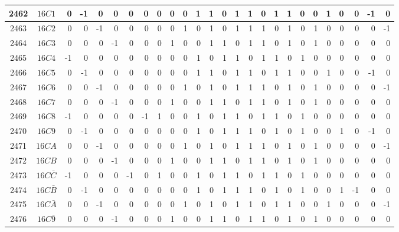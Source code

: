 \documentclass[12 pt]{article}%
\begin{document}
\begin{tiny}
\begin{centering}
\begin{longtable}{|c|c||rrrrrrrrrrrrrrrrrrrrrrrr|}
      \hline
      2462 & $16C1$ & 0 & -1 & 0 & 0 & 0 & 0 & 0 & 0 & 0 & 1 & 1 & 0 & 1 & 1 & 0 & 1 & 1 & 0 & 0 & 1 & 0 & 0 & -1 & 0 \\
      \hline
      2463 & $16C2$ & 0 & 0 & -1 & 0 & 0 & 0 & 0 & 0 & 1 & 0 & 1 & 0 & 1 & 1 & 1 & 0 & 1 & 0 & 1 & 0 & 0 & 0 & 0 & -1 \\
      \hline
      2464 & $16C3$ & 0 & 0 & 0 & -1 & 0 & 0 & 0 & 1 & 0 & 0 & 1 & 1 & 0 & 1 & 1 & 0 & 1 & 0 & 1 & 0 & 0 & 0 & 0 & 0 \\
      \hline
      2465 & $16C4$ & -1 & 0 & 0 & 0 & 0 & 0 & 0 & 0 & 0 & 1 & 0 & 1 & 1 & 0 & 1 & 1 & 0 & 1 & 0 & 0 & 0 & 0 & 0 & 0 \\
      \hline
      2466 & $16C5$ & 0 & -1 & 0 & 0 & 0 & 0 & 0 & 0 & 0 & 1 & 1 & 0 & 1 & 1 & 0 & 1 & 1 & 0 & 0 & 1 & 0 & 0 & -1 & 0 \\
      \hline
      2467 & $16C6$ & 0 & 0 & -1 & 0 & 0 & 0 & 0 & 0 & 1 & 0 & 1 & 0 & 1 & 1 & 1 & 0 & 1 & 0 & 1 & 0 & 0 & 0 & 0 & -1 \\
      \hline
      2468 & $16C7$ & 0 & 0 & 0 & -1 & 0 & 0 & 0 & 1 & 0 & 0 & 1 & 1 & 0 & 1 & 1 & 0 & 1 & 0 & 1 & 0 & 0 & 0 & 0 & 0 \\
      \hline
      2469 & $16C8$ & -1 & 0 & 0 & 0 & 0 & -1 & 1 & 0 & 0 & 1 & 0 & 1 & 1 & 0 & 1 & 1 & 0 & 1 & 0 & 0 & 0 & 0 & 0 & 0 \\
      \hline
      2470 & $16C9$ & 0 & -1 & 0 & 0 & 0 & 0 & 0 & 0 & 0 & 1 & 0 & 1 & 1 & 1 & 0 & 1 & 0 & 1 & 0 & 0 & 1 & 0 & -1 & 0 \\
      \hline
      2471 & $16CA$ & 0 & 0 & -1 & 0 & 0 & 0 & 0 & 0 & 1 & 0 & 1 & 0 & 1 & 1 & 1 & 0 & 1 & 0 & 1 & 0 & 0 & 0 & 0 & -1 \\
      \hline
      2472 & $16CB$ & 0 & 0 & 0 & -1 & 0 & 0 & 0 & 1 & 0 & 0 & 1 & 1 & 0 & 1 & 1 & 0 & 1 & 0 & 1 & 0 & 0 & 0 & 0 & 0 \\
      \hline
      2473 & $16C\bar C$ & -1 & 0 & 0 & 0 & -1 & 0 & 1 & 0 & 0 & 1 & 0 & 1 & 1 & 0 & 1 & 1 & 0 & 1 & 0 & 0 & 0 & 0 & 0 & 0 \\
      \hline
      2474 & $16C\bar B$ & 0 & -1 & 0 & 0 & 0 & 0 & 0 & 0 & 0 & 1 & 0 & 1 & 1 & 1 & 0 & 1 & 0 & 1 & 0 & 0 & 1 & -1 & 0 & 0 \\
      \hline
      2475 & $16C\bar A$ & 0 & 0 & -1 & 0 & 0 & 0 & 0 & 0 & 1 & 0 & 1 & 0 & 1 & 1 & 0 & 1 & 1 & 0 & 0 & 1 & 0 & 0 & 0 & -1 \\
      \hline
      2476 & $16C\bar9$ & 0 & 0 & 0 & -1 & 0 & 0 & 0 & 1 & 0 & 0 & 1 & 1 & 0 & 1 & 1 & 0 & 1 & 0 & 1 & 0 & 0 & 0 & 0 & 0 \\

\end{longtable}
\end{centering}
\end{tiny}
\end{document}
